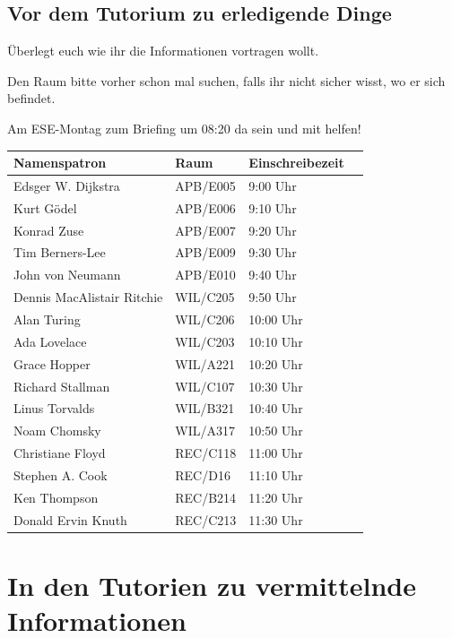 \documentclass[a4paper,12pt]{report}
\begin{document}
\section{Vor dem Tutorium zu erledigende Dinge}
\begin{itemize*}
\item Überlegt euch wie ihr die Informationen vortragen wollt.
\item Den Raum bitte vorher schon mal suchen, falls ihr nicht sicher wisst, wo er sich befindet.
\item Am ESE-Montag zum Briefing um 08:20 da sein und mit helfen!
\end{itemize*}

\begin{center}
\vspace{1cm}
\begin{tabular}[h]{|l|l|l|l|}
	\hline
	\textbf{Namenspatron}		& \textbf{Raum}	& \textbf{Einschreibezeit}\\ \hline
	Edsger W. Dijkstra			& APB/E005		& 9:00 Uhr\\
	Kurt Gödel					& APB/E006		& 9:10 Uhr\\
	Konrad Zuse					& APB/E007		& 9:20 Uhr\\
	Tim Berners-Lee				& APB/E009		& 9:30 Uhr\\
	John von Neumann			& APB/E010		& 9:40 Uhr\\
	Dennis MacAlistair Ritchie	& WIL/C205		& 9:50 Uhr\\
	Alan Turing 				& WIL/C206		& 10:00 Uhr\\
	Ada Lovelace				& WIL/C203		& 10:10 Uhr\\
	Grace Hopper				& WIL/A221		& 10:20 Uhr\\
	Richard Stallman			& WIL/C107		& 10:30 Uhr\\
	Linus Torvalds				& WIL/B321		& 10:40 Uhr\\
	Noam Chomsky				& WIL/A317		& 10:50 Uhr\\
	Christiane Floyd			& REC/C118		& 11:00 Uhr\\
	Stephen A. Cook				& REC/D16		& 11:10 Uhr\\
	Ken Thompson				& REC/B214		& 11:20 Uhr\\
	Donald Ervin Knuth			& REC/C213		& 11:30 Uhr\\
	\hline
\end{tabular}
\end{center}

\chapter{In den Tutorien zu vermittelnde Informationen}
\end{document}

